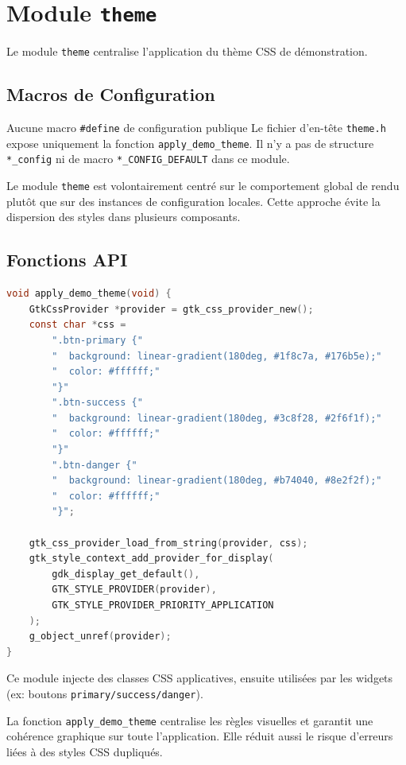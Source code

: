 \section{Module \texttt{theme}}

Le module \texttt{theme} centralise l'application du thème CSS de démonstration.

\subsection{Macros de Configuration}

\begin{docbox}{Aucune macro \texttt{\#define} de configuration publique}
Le fichier d'en-tête \texttt{theme.h} expose uniquement la fonction \texttt{apply\_demo\_theme}. Il n'y a pas de structure \texttt{*\_config} ni de macro \texttt{*\_CONFIG\_DEFAULT} dans ce module.
\end{docbox}

Le module \texttt{theme} est volontairement centré sur le comportement global de rendu plutôt que sur des instances de configuration locales. Cette approche évite la dispersion des styles dans plusieurs composants.

\subsection{Fonctions API}

\begin{lstlisting}[language=C]
void apply_demo_theme(void) {
    GtkCssProvider *provider = gtk_css_provider_new();
    const char *css =
        ".btn-primary {"
        "  background: linear-gradient(180deg, #1f8c7a, #176b5e);"
        "  color: #ffffff;"
        "}"
        ".btn-success {"
        "  background: linear-gradient(180deg, #3c8f28, #2f6f1f);"
        "  color: #ffffff;"
        "}"
        ".btn-danger {"
        "  background: linear-gradient(180deg, #b74040, #8e2f2f);"
        "  color: #ffffff;"
        "}";

    gtk_css_provider_load_from_string(provider, css);
    gtk_style_context_add_provider_for_display(
        gdk_display_get_default(),
        GTK_STYLE_PROVIDER(provider),
        GTK_STYLE_PROVIDER_PRIORITY_APPLICATION
    );
    g_object_unref(provider);
}
\end{lstlisting}

Ce module injecte des classes CSS applicatives, ensuite utilisées par les widgets (ex: boutons \texttt{primary/success/danger}).

La fonction \texttt{apply\_demo\_theme} centralise les règles visuelles et garantit une cohérence graphique sur toute l'application. Elle réduit aussi le risque d'erreurs liées à des styles CSS dupliqués.

\newpage

